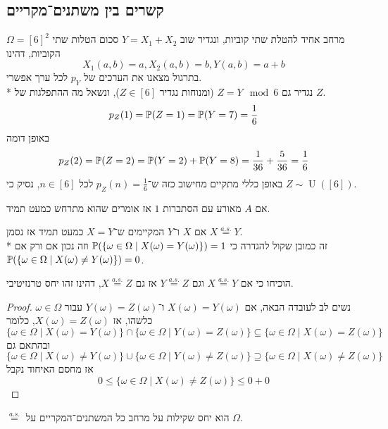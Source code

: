 \subsection{קשרים בין משתנים־מקריים}
\begin{example}
	$\Omega = {[6]}^2$ מרחב אחיד להטלת שתי קוביות, ונגדיר שוב $Y = X_1 + X_2$ סכום הטלות שתי הקוביות, דהינו
	\[
		X_1(a, b) = a,
		X_2(a, b) = b,
		Y(a, b) = a + b
	\]
	בתרגול מצאנו את הערכים של $p_Y$ לכל ערך אפשרי. \\*
	נגדיר גם $Z = Y \mod 6$ (ומנוחות נגדיר $Z \in [6]$), ונשאל מה ההתפלגות של $Z$.
	\[
		p_Z(1) = \mathbb{P}(Z = 1) = \mathbb{P}(Y = 7) = \frac{1}{6}
	\]
	באופן דומה
	\[
		p_Z(2) = \mathbb{P}(Z = 2) = \mathbb{P}(Y = 2) + \mathbb{P}(Y = 8) = \frac{1}{36} + \frac{5}{36} = \frac{1}{6}
	\]
	באופן כללי מתקיים מחישוב כזה ש־$p_Z(n) = \frac{1}{6}$ לכל $n \in [6]$, נסיק כי $Z \sim \operatorname{U}([6])$.
\end{example}
\begin{definition}
	אם $A$ מאורע עם הסתברות $1$ אז אומרים שהוא מתרחש כמעט תמיד.
\end{definition}
\begin{definition}
	אם $X$ ו־$Y$ המקיימים ש־$X = Y$ כמעט תמיד אז נסמן $X \overset{a.s.}{=} Y$. \\*
	זה כמובן שקול להגדרה כי $\mathbb{P}(\{ \omega \in \Omega \mid X(\omega) = Y(\omega) \}) = 1$ וזה נכון אם ורק אם $\mathbb{P}(\{\omega \in \Omega \mid X(\omega) \ne Y(\omega) \}) = 0$.
\end{definition}
\begin{exercise}
	הוכיחו כי אם $X \overset{a.s.}{=} Y$ וגם $Y \overset{a.s.}{=} Z$ אז גם $X \overset{a.s.}{=} Z$, דהינו זהו יחס טרנזיטיבי.
\end{exercise}
\begin{proof}
	נשים לב לעובדה הבאה, אם $X(\omega) = Y(\omega)$ ו־$Y(\omega) = Z(\omega)$ עבור $\omega \in \Omega$ כלשהו, אז $X(\omega) = Z(\omega)$,
	כלומר
	\[
		\{ \omega \in \Omega \mid X(\omega) = Y(\omega) \} \cap \{ \omega \in \Omega \mid Y(\omega) = Z(\omega) \} \subseteq \{ \omega \in \Omega \mid X(\omega) = Z(\omega) \}
	\]
	ובהתאם גם
	\[
		\{ \omega \in \Omega \mid X(\omega) \ne Y(\omega) \} \cup \{ \omega \in \Omega \mid Y(\omega) \ne Z(\omega) \} \supseteq \{ \omega \in \Omega \mid X(\omega) \ne Z(\omega) \}
	\]
	אז מחסם האיחוד נקבל
	\[
		0 \le \{ \omega \in \Omega \mid X(\omega) \ne Z(\omega) \} \le 0 + 0
	\]
\end{proof}
\begin{proposition}
	$\overset{a.s.}{=}$ הוא יחס שקילות על מרחב כל המשתנים־המקריים על $\Omega$.
\end{proposition}
